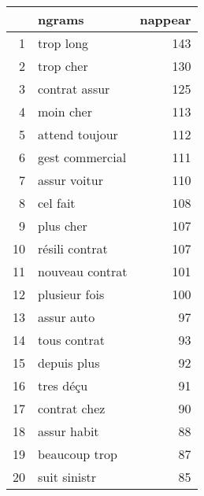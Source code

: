 \begin{tabular}{|r|l|r|}
  \hline
 & ngrams & nappear \\ 
  \hline
1 & trop long & 143 \\ 
  2 & trop cher & 130 \\ 
  3 & contrat assur & 125 \\ 
  4 & moin cher & 113 \\ 
  5 & attend toujour & 112 \\ 
  6 & gest commercial & 111 \\ 
  7 & assur voitur & 110 \\ 
  8 & cel fait & 108 \\ 
  9 & plus cher & 107 \\ 
  10 & résili contrat & 107 \\ 
  11 & nouveau contrat & 101 \\ 
  12 & plusieur fois & 100 \\ 
  13 & assur auto &  97 \\ 
  14 & tous contrat &  93 \\ 
  15 & depuis plus &  92 \\ 
  16 & tres déçu &  91 \\ 
  17 & contrat chez &  90 \\ 
  18 & assur habit &  88 \\ 
  19 & beaucoup trop &  87 \\ 
  20 & suit sinistr &  85 \\ 
   \hline
\end{tabular}
